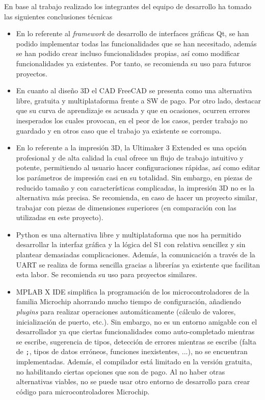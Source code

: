 En base al trabajo realizado los integrantes del equipo de desarrollo ha tomado las siguientes conclusiones técnicas 

\begin{itemize}

    \item En lo referente al \textit{framework} de desarrollo de interfaces gráficas Qt, se han podido implementar todas las funcionalidades que se han necesitado, además se han podido crear incluso funcionalidades propias, así como modificar funcionalidades ya existentes. Por tanto, se recomienda su uso para futuros proyectos.
    \item En cuanto al diseño 3D el CAD FreeCAD se presenta como una alternativa libre, gratuita y multiplataforma frente a \ac{SW} de pago. Por otro lado, destacar que su curva de aprendizaje es acusada y que en ocasiones, ocurren errores inesperados los cuales provocan, en el peor de los casos, perder trabajo no guardado y en otros caso que el trabajo ya existente se corrompa.
    \item En lo referente a la impresión 3D, la Ultimaker 3 Extended es una opción profesional y de alta calidad la cual ofrece un flujo de trabajo intuitivo y potente, permitiendo al usuario hacer configuraciones rápidas, así como editar los parámetros de impresión casi en su totalidad. Sin embargo, en piezas de reducido tamaño y con características complicadas, la impresión 3D no es la alternativa más precisa. Se recomienda, en caso de hacer un proyecto similar, trabajar con piezas de dimensiones superiores (en comparación con las utilizadas en este proyecto).
    \item Python es una alternativa libre y multiplataforma que nos ha permitido desarrollar la interfaz gráfica y la lógica del \ac{S1} con relativa sencillez y sin plantear demasiadas complicaciones. Además, la comunicación a través de la UART se realiza de forma sencilla gracias a librerías ya existente que facilitan esta labor. Se recomienda su uso para proyectos similares.
    \item MPLAB X IDE simplifica la programación de los microcontroladores de la familia Microchip ahorrando mucho tiempo de configuración, añadiendo \textit{plugins} para realizar operaciones automáticamente (cálculo de valores, inicialización de puerto, etc.). Sin embargo, no es un entorno amigable con el desarrollador ya que ciertas funcionalidades como auto-completado mientras se escribe, sugerencia de tipos, detección de errores mientras se escribe (falta de \texttt{;}, tipos de datos erróneos, funciones inexistentes, ...), no se encuentran implementadas. Además, el compilador está limitado en la versión gratuita, no habilitando ciertas opciones que son de pago. Al no haber otras alternativas viables, no se puede usar otro entorno de desarrollo para crear código para microcontroladores Microchip.

\end{itemize}
